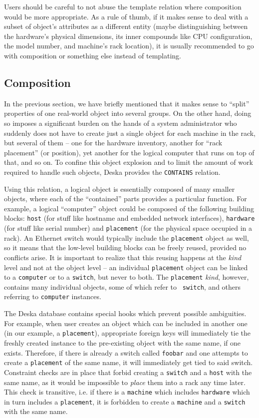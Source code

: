\documentclass[deska]{subfiles}
\begin{document}
Users should be careful to not abuse the template relation where composition would be more appropriate.  As a rule of
thumb, if it makes sense to deal with a subset of object's attributes as a different entity (maybe distinguishing
between the hardware's physical dimensions, its inner compounds like CPU configuration, the model number, and machine's
rack location), it is usually recommended to go with composition or something else instead of templating.

\subsection{Composition}

In the previous section, we have briefly mentioned that it makes sense to ``split'' properties of one real-world object
into several groups.  On the other hand, doing so imposes a significant burden on the hands of a system administrator
who suddenly does not have to create just a single object for each machine in the rack, but several of them -- one for
the hardware inventory, another for ``rack placement'' (or position), yet another for the logical computer that runs on
top of that, and so on.  To confine this object explosion and to limit the amount of work required to handle such
objects, Deska provides the {\tt CONTAINS} relation.

Using this relation, a logical object is essentially composed of many smaller objects, where each of the ``contained''
parts provides a particular function.  For example, a logical ``computer'' object could be composed of the following
building blocks: {\tt host} (for stuff like hostname and embedded network interfaces), {\tt hardware} (for stuff like
serial number) and {\tt placement} (for the physical space occupied in a rack).  An Ethernet switch would typically
include the {\tt placement} object as well, so it means that the low-level building blocks can be freely reused,
provided no conflicts arise.  It is important to realize that this reusing happens at the {\em kind} level and not at
the object level --  an individual {\tt placement} object can be linked to a {\tt computer} or to a {\tt switch}, but
never to both.  The {\tt placement} {\em kind}, however, contains many individual objects, some of which refer to {\tt
switch}, and others referring to {\tt computer} instances.

The Deska database contains special hooks which prevent possible ambiguities. For example, when user creates an object
which can be included in another one (in our example, a {\tt placement}), appropriate foreign keys will immediately tie
the freshly created instance to the pre-existing object with the same name, if one exists.  Therefore, if there is
already a switch called {\tt foobar} and one attempts to create a {\tt placement} of the same name, it will immediately
get tied to said switch.  Constraint checks are in place that forbid creating a {\tt switch} and a
{\tt host} with the same name, as it would be impossible to {\em place} them into a rack any time later.  This check is
transitive, i.e. if there is a {\tt machine} which includes {\tt hardware} which in turn includes a {\tt placement}, it
is forbidden to create a {\tt machine} and a {\tt switch} with the same name.
\end{document}

